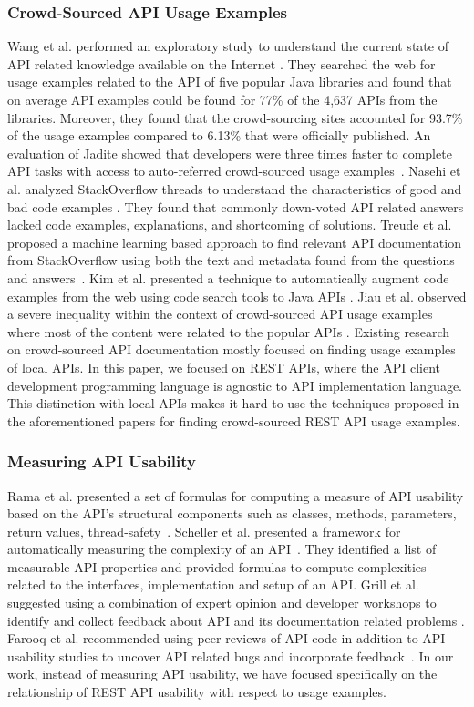 \documentclass[conference]{IEEEtran}
\begin{document}
\subsubsection{Crowd-Sourced API Usage Examples}
Wang et al. performed an exploratory study to understand the current state of API related knowledge available on the Internet \cite{6462686}. They searched the web for usage examples related to the API of five popular Java libraries and found that on average API examples could be found for 77\% of the 4,637 APIs from the libraries. Moreover, they found that the crowd-sourcing sites accounted for 93.7\% of the usage examples compared to 6.13\% that were officially published. An evaluation of Jadite showed that developers were three times faster to complete API tasks with access to auto-referred crowd-sourced usage examples~\cite{5295283}. Nasehi et al. analyzed StackOverflow threads to understand the characteristics of good and bad code examples \cite{Nasehi_what_makes}. They found that commonly down-voted API related answers lacked code examples, explanations, and shortcoming of solutions. Treude et al. proposed a machine learning based approach to find relevant API documentation from StackOverflow using both the text and metadata found from the questions and answers~\cite{Treude:2016:AAD:2884781.2884800}. Kim et al. presented a technique to automatically augment code examples from the web using code search tools to Java APIs \cite{Kim:2009:AEJ:1747491.1747552}. Jiau et al. observed a severe inequality within the context of crowd-sourced API usage examples where most of the content were related to the popular APIs \cite{jiau}. Existing research on crowd-sourced API documentation mostly focused on finding usage examples of local APIs. In this paper, we focused on REST APIs, where the API client development programming language is agnostic to API implementation language. This distinction with local APIs makes it hard to use the techniques proposed in the aforementioned papers for finding crowd-sourced REST API usage examples.

\subsubsection{Measuring API Usability}
Rama et al. presented a set of formulas for computing a measure of API usability based on the API's structural components such as classes, methods, parameters, return values, thread-safety~\cite{rama}. Scheller et al. presented a framework for automatically measuring the complexity of an API~\cite{scheller2015automated}. They identified a list of measurable API properties and provided formulas to compute complexities related to the interfaces, implementation and setup of an API. Grill et al. suggested using a combination of expert opinion and developer workshops to identify and collect feedback about API and its documentation related problems \cite{Grill2012}. Farooq et al. recommended using peer reviews of API code in addition to API usability studies to uncover API related bugs and incorporate feedback~\cite{Farooq:2010:AUP:1753326.1753677}. In our work, instead of measuring API usability, we have focused specifically on the relationship of REST API usability with respect to usage examples.
\end{document}
